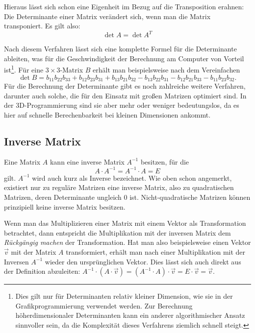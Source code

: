 Hieraus lässt sich schon eine Eigenheit im Bezug auf die Transposition erahnen: Die Determinante einer Matrix verändert sich, wenn man die Matrix transponiert. Es gilt also:
\begin{equation}
\label{transposeddeterminant}
 \det A = \det A^T
\end{equation}

Nach diesem Verfahren lässt sich eine komplette Formel für die Determinante ableiten, was für die Geschwindigkeit der Berechnung am Computer von Vorteil ist\footnote{Dies gilt nur für Determinanten relativ kleiner Dimension, wie sie in der Grafikprogrammierung verwendet werden. Zur Berechnung höherdimensionaler Determinanten kann ein anderer algorithmischer Ansatz sinnvoller sein, da die Komplexität dieses Verfahrens ziemlich schnell steigt.}. Für eine $3 \times 3$-Matrix $B$ erhält man beispielsweise nach dem Vereinfachen
\begin{equation}
 \det B = b_{11} b_{22} b_{33} + b_{12} b_{23} b_{31} + b_{13} b_{21} b_{32} - b_{13} b_{22} b_{31} - b_{12} b_{21} b_{33} - b_{11} b_{23} b_{32}.
\end{equation}
Für die Berechnung der Determinante gibt es noch zahlreiche weitere Verfahren, darunter auch solche, die für den Einsatz mit großen Matrizen optimiert sind. In der 3D-Programmierung sind sie aber mehr oder weniger bedeutungslos, da es hier auf schnelle Berechenbarkeit bei kleinen Dimensionen ankommt.


\subsection{Inverse Matrix}
\label{inversion}
Eine Matrix $A$ kann eine inverse Matrix $A^{-1}$ besitzen, für die
\begin{equation}
 A \cdot A^{-1} = A^{-1} \cdot A = E
\end{equation}
gilt. $A^{-1}$ wird auch kurz als Inverse bezeichnet. Wie oben schon angemerkt, existiert nur zu reguläre Matrizen eine inverse Matrix, also zu quadratischen Matrizen, deren Determinante ungleich 0 ist. Nicht-quadratische Matrizen können prinzipiell keine inverse Matrix besitzen.

Wenn man das Multiplizieren einer Matrix mit einem Vektor als Transformation betrachtet, dann entspricht die Multiplikation mit der inversen Matrix dem \emph{Rückgängig machen} der Transformation. Hat man also beispielsweise einen Vektor $\vec v$ mit der Matrix $A$ transformiert, erhält man nach einer Multiplikation mit der Inversen $A^{-1}$ wieder den ursprünglichen Vektor. Dies lässt sich auch direkt aus der Definition abzuleiten: $A^{-1} \cdot ( A \cdot \vec v ) = (A^{-1} \cdot A) \cdot \vec v = E \cdot \vec v = \vec v$.

